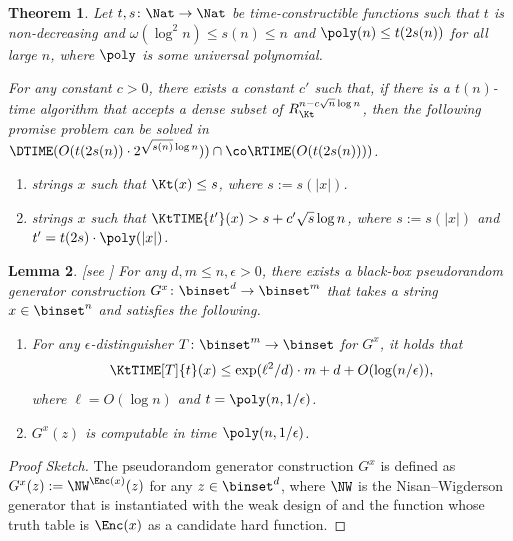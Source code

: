 \documentclass[11pt]{article}
\numberwithin{equation}{section}
\newtheorem{theorem}{Theorem}[section]
\newtheorem{lemma}[theorem]{Lemma}
\theoremstyle{definition}
\theoremstyle{plain}
\begin{document}
\begin{theorem}
  \label{thm_WorstToAverageForMKtP}
  Let $t, s \colon \Nat \to \Nat$ be time-constructible functions such that
  $t$ is non-decreasing and
  $\omega(\log^2 n) \le s(n) \le n$
  and
  $\poly(n) \le t(2 s(n))$
  for all large $n$,
  where $\poly$ is some universal polynomial.

  For any constant $c > 0$, there exists a constant $c'$
  such that,
  if
  there is a $t(n)$-time algorithm that accepts a dense subset of $R_{\Kt}^{n - c \sqrt{n} \log n}$,
  then
  the following promise problem can be solved in $\DTIME(O(t(2 s(n)) \cdot 2^{\sqrt{s(n)} \log n})) \cap \co\RTIME(O(t(2 s(n))))$.
  \begin{enumerate}
    \item
          [\Yes:]
          strings $x$ such that
          $\Kt(x) \le s$, where $s := s(|x|)$.
    \item
          [\No:]
          strings $x$ such that
          $\KtTIME{t'}(x) > s + c' \sqrt{s} \log n$,
          where
          $s := s(|x|)$
          and $t' = t(2 s) \cdot \poly(|x|)$.
  \end{enumerate}
\end{theorem}

\begin{lemma}
  [see \cite{Hirahara18_focs_conf}] %
  \label{lemma_NWwithEnc}
  For any $d, m \le n, \epsilon > 0$,
  there exists a black-box pseudorandom generator construction $G^{x} \colon \binset^d \to \binset^m$
  that takes a string $x \in \binset^{n}$ and satisfies the following.
  \begin{enumerate}
    \item
          For any $\epsilon$-distinguisher $T \colon \binset^m \to \binset$ for $G^x$,
          it holds that
          $$\KtTIME[T]{t}(x) \le \exp(\ell^2 / d) \cdot m + d + O(\log (n / \epsilon)),$$ where $\ell = O(\log n)$ and $t = \poly(n, 1 / \epsilon)$.
    \item
          $G^x(z)$ is computable in time $\poly(n, 1 / \epsilon)$.
  \end{enumerate}
\end{lemma}
\begin{proof}
  [Proof Sketch]
  The pseudorandom generator construction $G^x$ is defined as
  $G^x(z) := \NW^{\Enc(x)}(z)$ for any $z \in \binset^d$,
  where $\NW$ is the Nisan--Wigderson generator \cite{NisanW94_jcss_journals} that is instantiated with the weak design of \cite{RazRV02_jcss_journals}
  and the function whose truth table is $\Enc(x)$ as a candidate hard function.
\end{proof}
\end{document}
